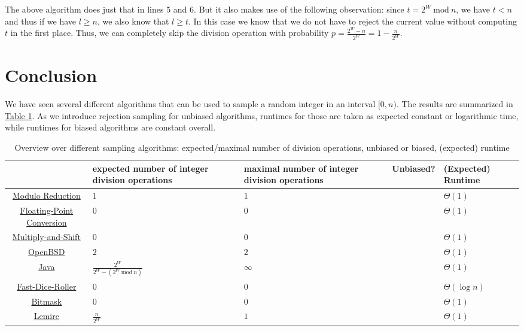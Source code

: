 \documentclass[a4paper, UKenglish, cleveref, autoref, thm-restate]{lipics-v2021}
\newcommand{\Mod}[1]{\ \mathrm{mod}\ #1}
\newcommand{\cmark}{\ding{51}}
\newcommand{\xmark}{\ding{55}}
\begin{document}
The above algorithm does just that in lines $5$ and $6$.
But it also makes use of the following observation: since $t = 2^W \Mod n$, we have $t < n$ and thus if we have $l \geq n$, we also know that $l \geq t$.
In this case we know that we do not have to reject the current value without computing $t$ in the first place.
Thus, we can completely skip the division operation with probability $p = \frac{2^W - n}{2^W} = 1 - \frac{n}{2^W}$.



\section{Conclusion}\label{sec:4}
We have seen several different algorithms that can be used to sample a random integer in an interval $[0,n)$.
The results are summarized in \hyperref[tab:1]{Table 1}.
As we introduce rejection sampling for unbiased algorithms, runtimes for those are taken as expected constant or logarithmic time, while runtimes for biased algorithms are constant overall.

\begin{table}[!htb]
    \centering
    \begin{tabular}{c|P{25mm}P{25mm}P{15mm}P{15mm}}
        \toprule
        & expected number of integer division operations & maximal number of integer division operations & Unbiased? & (Expected) Runtime \\
        \midrule
        \hyperref[sec:2.1.1]{Modulo Reduction} & $1$ & $1$ & \xmark & $\Theta(1)$ \\
        \hyperref[sec:2.1.2]{Floating-Point Conversion} & $0$ & $0$ & \xmark & $\Theta(1)$ \\
        \hyperref[sec:2.1.3]{Multiply-and-Shift} & $0$ & $0$ & \xmark & $\Theta(1)$ \\
        \hyperref[sec:2.2.1]{OpenBSD} & $2$ & $2$ & \cmark & $\Theta(1)$ \\
        \hyperref[sec:2.2.2]{Java} & $\frac{2^W}{2^W - (2^W \Mod n)}$ & $\infty$ & \cmark & $\Theta(1)$ \\
        \hyperref[sec:2.2.3]{Fast-Dice-Roller} & $0$ & $0$ & \cmark & $\Theta(\log n)$ \\
        \hyperref[sec:2.2.4]{Bitmask} & $0$ & $0$ & \cmark & $\Theta(1)$ \\
        \hyperref[sec:3]{Lemire} & $\frac{n}{2^W}$ & $1$ & \cmark & $\Theta(1)$ \\
        \bottomrule
    \end{tabular}
    \caption{
        Overview over different sampling algorithms: expected/maximal number of division operations, unbiased or biased, (expected) runtime
    }
    \label{tab:1}
\end{table}
\end{document}
